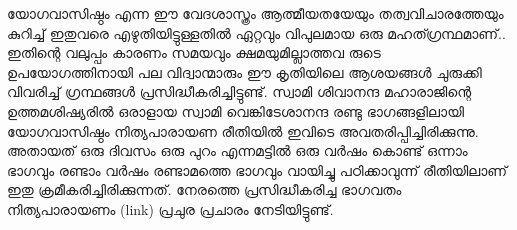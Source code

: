 \newpage
{}

യോഗവാസിഷ്ഠം എന്ന ഈ വേദശാസ്ത്രം ആത്മീയതയേയും തത്വവിചാരത്തേയും കുറിച്ച്‌ ഇതുവരെ എഴുതിയിട്ടുള്ളതില്‍ ഏറ്റവും വിപുലമായ ഒരു മഹത്ഗ്രന്ഥമാണ്‌.. ഇതിന്റെ വലുപ്പം കാരണം സമയവും ക്ഷമയുമില്ലാത്തവ രുടെ ഉപയോഗത്തിനായി പല വിദ്വാന്മാരും ഈ കൃതിയിലെ ആശയങ്ങള്‍ ചുരുക്കി വിവരിച്ച്‌ ഗ്രന്ഥങ്ങള്‍ പ്രസിദ്ധീകരിച്ചിട്ടുണ്ട്‌. സ്വാമി ശിവാനന്ദ മഹാരാജിന്റെ ഉത്തമശിഷ്യരില്‍ ഒരാളായ സ്വാമി വെങ്കിടേശാനന്ദ രണ്ടു ഭാഗങ്ങളിലായി യോഗവാസിഷ്ഠം നിത്യപാരായണ രീതിയില്‍ ഇവിടെ അവതരിപ്പിച്ചിരിക്കുന്നു. അതായത്‌ ഒരു ദിവസം ഒരു പുറം എന്നമട്ടില്‍ ഒരു വര്‍ഷം കൊണ്ട്‌ ഒന്നാം ഭാഗവും രണ്ടാം വര്‍ഷം രണ്ടാമത്തെ ഭാഗവും വായിച്ചു പഠിക്കാവുന്ന് രീതിയിലാണ്‌ ഇതു ക്രമീകരിച്ചിരിക്കുന്നത്‌.  നേരത്തെ പ്രസിദ്ധീകരിച്ച  ഭാഗവതം നിത്യപാരായണം (link) പ്രചുര പ്രചാരം നേടിയിട്ടുണ്ട്.
